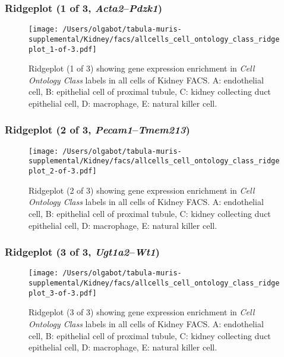 \clearpage

\subsubsection{Ridgeplot (1 of 3, \emph{Acta2}--\emph{Pdzk1})}
\begin{figure}[h]
\centering
\texttt{[image: /Users/olgabot/tabula-muris-supplemental/Kidney/facs/allcells\_cell\_ontology\_class\_ridgeplot\_1-of-3.pdf]}

\caption{ Ridgeplot (1 of 3)  showing gene expression enrichment in \emph{Cell Ontology Class} labels in all cells of Kidney FACS. A: endothelial cell, B: epithelial cell of proximal tubule, C: kidney collecting duct epithelial cell, D: macrophage, E: natural killer cell.}
\end{figure}


\clearpage

\subsubsection{Ridgeplot (2 of 3, \emph{Pecam1}--\emph{Tmem213})}
\begin{figure}[h]
\centering
\texttt{[image: /Users/olgabot/tabula-muris-supplemental/Kidney/facs/allcells\_cell\_ontology\_class\_ridgeplot\_2-of-3.pdf]}

\caption{ Ridgeplot (2 of 3)  showing gene expression enrichment in \emph{Cell Ontology Class} labels in all cells of Kidney FACS. A: endothelial cell, B: epithelial cell of proximal tubule, C: kidney collecting duct epithelial cell, D: macrophage, E: natural killer cell.}
\end{figure}


\clearpage

\subsubsection{Ridgeplot (3 of 3, \emph{Ugt1a2}--\emph{Wt1})}
\begin{figure}[h]
\centering
\texttt{[image: /Users/olgabot/tabula-muris-supplemental/Kidney/facs/allcells\_cell\_ontology\_class\_ridgeplot\_3-of-3.pdf]}

\caption{ Ridgeplot (3 of 3)  showing gene expression enrichment in \emph{Cell Ontology Class} labels in all cells of Kidney FACS. A: endothelial cell, B: epithelial cell of proximal tubule, C: kidney collecting duct epithelial cell, D: macrophage, E: natural killer cell.}
\end{figure}


